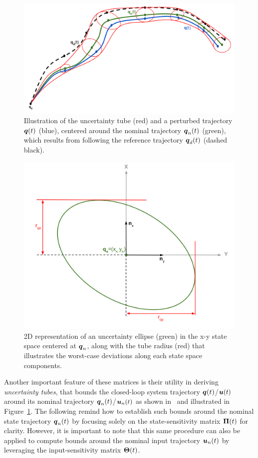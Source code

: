 \begin{figure} [t]
  \centering
  \includegraphics[width=0.8\linewidth]{figures/models/tubes.png} 
  \caption{Illustration of the uncertainty tube (red) and a perturbed trajectory $\boldsymbol{q}(t)$ (blue), centered around the nominal trajectory $\boldsymbol{q}_n(t)$ (green), which results from following the reference trajectory $\boldsymbol{q}_d(t)$ (dashed black).}%
  \label{fig:tubes}%
\end{figure}

\begin{figure} [t]
  \centering
  \includegraphics[width=0.6\linewidth]{figures/models/radius.png} 
  \caption{2D representation of an uncertainty ellipse (green) in the x-y state space centered at $\boldsymbol{q}_n$, along with the tube radius (red) that illustrates the worst-case deviations along each state space components.}%
  \label{fig:ellips_radius}%
\end{figure}

Another important feature of these matrices is their utility in deriving \emph{uncertainty tubes}, that bounds the closed-loop system trajectory $\boldsymbol{q}(t)$/$\boldsymbol{u}(t)$ around its nominal trajectory $\boldsymbol{q}_n(t)$/$\boldsymbol{u}_n(t)$ as shown in~\cite{cTube} and illustrated in Figure~\ref{fig:tubes}.
The following remind how to establish such bounds around the nominal state trajectory $\boldsymbol{q}_n(t)$ by focusing solely on the state-sensitivity matrix $\boldsymbol{\Pi}(t)$ for clarity. 
However, it is important to note that this same procedure can also be applied to compute bounds around the nominal input trajectory $\boldsymbol{u}_n(t)$ by leveraging the input-sensitivity matrix $\boldsymbol{\Theta}(t)$.

